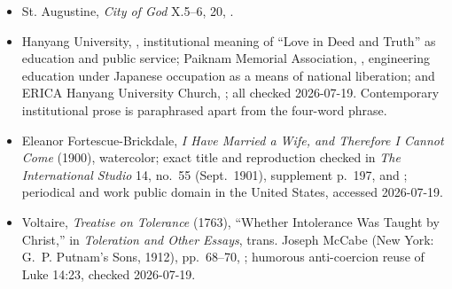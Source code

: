 \begin{deepstudy}
{\begin{itemize}
\item St. Augustine, \emph{City of God} X.5--6, 20, .
\item Hanyang University, , institutional meaning of ``Love in Deed and Truth'' as education and public service; Paiknam Memorial Association, , engineering education under Japanese occupation as a means of national liberation; and ERICA Hanyang University Church, ; all checked 2026-07-19. Contemporary institutional prose is paraphrased apart from the four-word phrase.
\item Eleanor Fortescue-Brickdale, \emph{I Have Married a Wife, and Therefore I Cannot Come} (1900), watercolor; exact title and reproduction checked in \emph{The International Studio} 14, no.~55 (Sept.~1901), supplement p.~197,  and ; periodical and work public domain in the United States, accessed 2026-07-19.
\item Voltaire, \emph{Treatise on Tolerance} (1763), ``Whether Intolerance Was Taught by Christ,'' in \emph{Toleration and Other Essays}, trans. Joseph McCabe (New York: G.~P. Putnam's Sons, 1912), pp.~68--70, ; humorous anti-coercion reuse of Luke 14:23, checked 2026-07-19.
\end{itemize}
}


\end{deepstudy}
